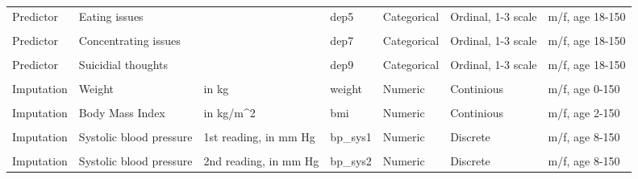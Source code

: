 \documentclass[
]{article}
\begin{document}
\begin{table}[!h]
{\begin{tabular}[t]{lllllll}
Predictor & Eating issues &  & dep5 & Categorical & Ordinal, 1-3 scale & m/f, age 18-150\\
\cellcolor{gray!6}{Predictor} & \cellcolor{gray!6}{Feeling bad about yourself} & \cellcolor{gray!6}{} & \cellcolor{gray!6}{dep6} & \cellcolor{gray!6}{Categorical} & \cellcolor{gray!6}{Ordinal, 1-3 scale} & \cellcolor{gray!6}{m/f, age 18-150}\\
Predictor & Concentrating issues &  & dep7 & Categorical & Ordinal, 1-3 scale & m/f, age 18-150\\
\cellcolor{gray!6}{Predictor} & \cellcolor{gray!6}{Moving and speaking issues} & \cellcolor{gray!6}{} & \cellcolor{gray!6}{dep8} & \cellcolor{gray!6}{Categorical} & \cellcolor{gray!6}{Ordinal, 1-3 scale} & \cellcolor{gray!6}{m/f, age 18-150}\\
\addlinespace
Predictor & Suicidial thoughts &  & dep9 & Categorical & Ordinal, 1-3 scale & m/f, age 18-150\\
\cellcolor{gray!6}{Imputation} & \cellcolor{gray!6}{Household size} & \cellcolor{gray!6}{number of people} & \cellcolor{gray!6}{household\_size} & \cellcolor{gray!6}{Numeric} & \cellcolor{gray!6}{Discrete} & \cellcolor{gray!6}{m/f, age 0-150}\\
Imputation & Weight & in kg & weight & Numeric & Continious & m/f, age 0-150\\
\cellcolor{gray!6}{Imputation} & \cellcolor{gray!6}{Height} & \cellcolor{gray!6}{standing in cm} & \cellcolor{gray!6}{height} & \cellcolor{gray!6}{Numeric} & \cellcolor{gray!6}{Continious} & \cellcolor{gray!6}{m/f, age 2-150}\\
Imputation & Body Mass Index & in kg/m\textasciicircum{}2 & bmi & Numeric & Continious & m/f, age 2-150\\
\addlinespace
\cellcolor{gray!6}{Imputation} & \cellcolor{gray!6}{Pulse} & \cellcolor{gray!6}{beats per minute} & \cellcolor{gray!6}{pulse} & \cellcolor{gray!6}{Numeric} & \cellcolor{gray!6}{Discrete} & \cellcolor{gray!6}{m/f, age 8-150}\\
Imputation & Systolic blood pressure & 1st reading, in mm Hg & bp\_sys1 & Numeric & Discrete & m/f, age 8-150\\
\cellcolor{gray!6}{Imputation} & \cellcolor{gray!6}{Diastolic blood pressure} & \cellcolor{gray!6}{1st reading, in mm Hg} & \cellcolor{gray!6}{bp\_dia1} & \cellcolor{gray!6}{Numeric} & \cellcolor{gray!6}{Discrete} & \cellcolor{gray!6}{m/f, age 8-150}\\
Imputation & Systolic blood pressure & 2nd reading, in mm Hg & bp\_sys2 & Numeric & Discrete & m/f, age 8-150\\

\end{tabular}}
\end{table}
\end{document}
